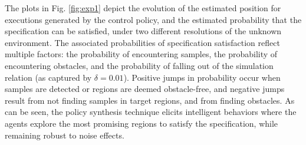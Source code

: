 \documentclass{ifacconf}
\begin{document}
The plots in Fig. \ref{fig:exp1} depict the evolution of the estimated position for executions generated by the control policy, and the estimated probability that the specification can be satisfied, under two different resolutions of the unknown environment. The associated probabilities of specification satisfaction reflect multiple factors: the probability of encountering samples, the probability of encountering obstacles, and the probability of falling out of the simulation relation (as captured by $\delta = 0.01$). Positive jumps in probability occur when samples are detected or regions are deemed obstacle-free, and negative jumps result from not finding samples in target regions, and from finding obstacles. As can be seen, the policy synthesis technique elicits intelligent behaviors where the agents explore the most promising regions to satisfy the specification, while remaining robust to noise effects.
\end{document}
